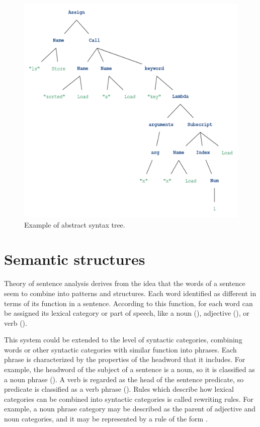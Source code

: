 \begin{figure}
\centering
\includegraphics{Figures/ast}
\decoRule
\caption[Abstract Syntax Tree]{Example of abstract syntax tree.}
\label{fig:ast}
\end{figure}

\section{Semantic structures}
Theory of sentence analysis derives from the idea that the words of a sentence seem to combine into patterns and structures. Each word identified as different in terms of its function in a sentence. According to this function, for each word can be assigned its lexical category or part of speech, like a noun (), adjective (), or verb (). 

This system could be extended to the level of syntactic categories, combining words or other syntactic categories with similar function into phrases. Each phrase is characterized by the properties of the headword that it includes. For example, the headword of the subject of a sentence is a noun, so it is classified as a noun phrase (). A verb is regarded as the head of the sentence predicate, so predicate is classified as a verb phrase (). Rules which describe how lexical categories can be combined into syntactic categories is called rewriting rules. For example, a noun phrase category may be described as the parent of adjective and noun categories, and it may be represented by a rule of the form . 

